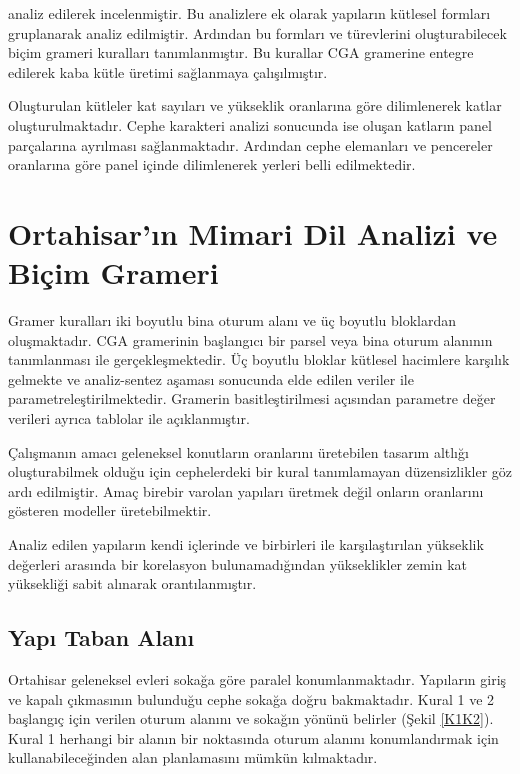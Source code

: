 \documentclass[12pt,turkish,a4paperpaper,]{report}
\begin{document}
analiz edilerek incelenmiştir. Bu analizlere ek olarak yapıların
kütlesel formları gruplanarak analiz edilmiştir. Ardından bu formları ve
türevlerini oluşturabilecek biçim grameri kuralları tanımlanmıştır. Bu
kurallar CGA gramerine entegre edilerek kaba kütle üretimi sağlanmaya
çalışılmıştır.

Oluşturulan kütleler kat sayıları ve yükseklik oranlarına göre
dilimlenerek katlar oluşturulmaktadır. Cephe karakteri analizi sonucunda
ise oluşan katların panel parçalarına ayrılması sağlanmaktadır. Ardından
cephe elemanları ve pencereler oranlarına göre panel içinde dilimlenerek
yerleri belli edilmektedir.

\hypertarget{ortahisarux131n-mimari-dil-analizi-ve-biuxe7im-grameri}{%
\section{Ortahisar'ın Mimari Dil Analizi ve Biçim
Grameri}\label{ortahisarux131n-mimari-dil-analizi-ve-biuxe7im-grameri}}

Gramer kuralları iki boyutlu bina oturum alanı ve üç boyutlu bloklardan
oluşmaktadır. CGA gramerinin başlangıcı bir parsel veya bina oturum
alanının tanımlanması ile gerçekleşmektedir. Üç boyutlu bloklar kütlesel
hacimlere karşılık gelmekte ve analiz-sentez aşaması sonucunda elde
edilen veriler ile parametreleştirilmektedir. Gramerin basitleştirilmesi
açısından parametre değer verileri ayrıca tablolar ile açıklanmıştır.

Çalışmanın amacı geleneksel konutların oranlarını üretebilen tasarım
altlığı oluşturabilmek olduğu için cephelerdeki bir kural tanımlamayan
düzensizlikler göz ardı edilmiştir. Amaç birebir varolan yapıları
üretmek değil onların oranlarını gösteren modeller üretebilmektir.

Analiz edilen yapıların kendi içlerinde ve birbirleri ile
karşılaştırılan yükseklik değerleri arasında bir korelasyon
bulunamadığından yükseklikler zemin kat yüksekliği sabit alınarak
orantılanmıştır.

\hypertarget{yapux131-taban-alanux131}{%
\subsection{Yapı Taban Alanı}\label{yapux131-taban-alanux131}}

Ortahisar geleneksel evleri sokağa göre paralel konumlanmaktadır.
Yapıların giriş ve kapalı çıkmasının bulunduğu cephe sokağa doğru
bakmaktadır. Kural 1 ve 2 başlangıç için verilen oturum alanını ve
sokağın yönünü belirler (Şekil \ref{K1K2}). Kural 1 herhangi bir alanın
bir noktasında oturum alanını konumlandırmak için kullanabileceğinden
alan planlamasını mümkün kılmaktadır.
\end{document}
